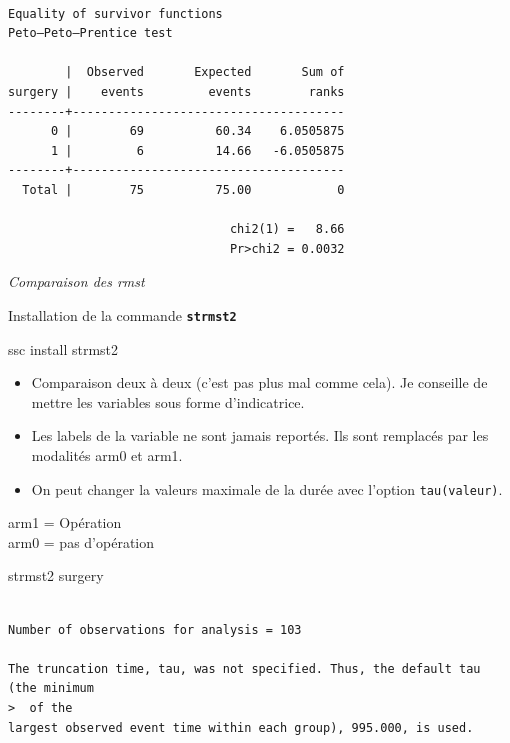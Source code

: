 \documentclass[
  12pt,
  letterpaper,
  DIV=11,
  numbers=noendperiod,
  onepage,
  openany]{scrreprt}
\newenvironment{Shaded}{\begin{snugshade}}{\end{snugshade}}
\newcommand{\KeywordTok}[1]{\textcolor[rgb]{0.94,0.87,0.69}{#1}}
\newcommand{\NormalTok}[1]{\textcolor[rgb]{0.80,0.80,0.80}{#1}}
\providecommand{\tightlist}{%
  \setlength{\itemsep}{0pt}\setlength{\parskip}{0pt}}\usepackage{longtable,booktabs,array}
\begin{document}
\begin{verbatim}

Equality of survivor functions
Peto–Peto–Prentice test

        |  Observed       Expected       Sum of
surgery |    events         events        ranks
--------+--------------------------------------
      0 |        69          60.34    6.0505875
      1 |         6          14.66   -6.0505875
--------+--------------------------------------
  Total |        75          75.00            0

                               chi2(1) =   8.66
                               Pr>chi2 = 0.0032
\end{verbatim}

\emph{Comparaison des rmst}

Installation de la commande \textbf{\texttt{strmst2}}

\begin{Shaded}
\begin{Highlighting}[]
\KeywordTok{ssc}\NormalTok{ install strmst2}
\end{Highlighting}
\end{Shaded}

\begin{itemize}
\tightlist
\item
  Comparaison deux à deux (c'est pas plus mal comme cela). Je conseille
  de mettre les variables sous forme d'indicatrice.
\item
  Les labels de la variable ne sont jamais reportés. Ils sont remplacés
  par les modalités arm0 et arm1.
\item
  On peut changer la valeurs maximale de la durée avec l'option
  \texttt{tau(valeur)}.
\end{itemize}

arm1 = Opération\\
arm0 = pas d'opération

\begin{Shaded}
\begin{Highlighting}[]
\NormalTok{strmst2 surgery}
\end{Highlighting}
\end{Shaded}

\begin{verbatim}
 
Number of observations for analysis = 103
 
The truncation time, tau, was not specified. Thus, the default tau (the minimum
>  of the
largest observed event time within each group), 995.000, is used.
\end{verbatim}
\end{document}
